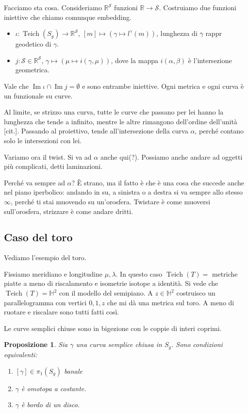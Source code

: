 \documentclass[a4paper]{article}
\newtheorem{proposition}{Proposizione}
\theoremstyle{definition}
\DeclareMathOperator{\Teich}{Teich}
\DeclareMathOperator{\im}{Im}
\begin{document}
    Facciamo sta cosa. Consideriamo $\mathbb R^\mathcal S$ funzioni $\mathbb R \to \mathcal S$. Costruiamo due funzioni iniettive che chiamo comunque embedding.
    \begin{itemize}
        \item $\iota: \Teich(S_g) \to \mathbb R^\mathcal{S}$, $[m] \mapsto \left(\gamma \mapsto l^\gamma(m)\right)$, lunghezza di $\overline{\gamma}$ rappr geodetico di $\gamma$.
        \item $j: \mathcal S \in \mathbb R^{\mathcal S}$, $\gamma \mapsto (\mu \mapsto i(\gamma,\mu))$, dove la mappa $i(\alpha,\beta)$ è l'intersezione geometrica.
    \end{itemize}

    Vale che $\im \iota \cap \im j = \emptyset$ e sono entrambe iniettive. Ogni metrica e ogni curva è un funzionale su curve.

    Al limite, se strizzo una curva, tutte le curve che passano per lei hanno la lunghezza che tende a infinito, mentre le altre rimangono dell'ordine dell'unità [cit.].
    Passando al proiettivo, tende all'intersezione della curva $\alpha$, perché contano solo le intersezioni con lei.

    Variamo ora il twist. Si va ad $\alpha$ anche qui(?). Possiamo anche andare ad oggetti più complicati, detti laminazioni.

    Perché va sempre ad $\alpha$? È strano, ma il fatto è che è una cosa che succede anche nel piano iperbolico: andando in su, a sinistra o a destra si va sempre allo stesso $\infty$, perché ti stai muovendo su un'orosfera. Twistare è come muoversi sull'orosfera, strizzare è come andare dritti.

\subsection{Caso del toro}
    Vediamo l'esempio del toro.

    Fissiamo meridiano e longitudine $ \mu, \lambda$. In questo caso $\Teich(T) =$ metriche piatte a meno di riscalamento e isometrie isotope a identità. Si vede che $\Teich(T) = \mathbb H^2$ con il modello del semipiano. A $z \in \mathbb H^2$ costruisco un parallelogramma con vertici $0, 1, z$ che mi dà una metrica sul toro. A meno di ruotare e riscalare sono tutti fatti così.

    Le curve semplici chiuse sono in bigezione con le coppie di interi coprimi.

    \begin{proposition}
        Sia $\gamma$ una curva semplice chiusa in $S_g$. Sono condizioni equivalenti:
        \begin{enumerate}
            \item $[\gamma] \in \pi_1(S_g)$ banale
            \item $\gamma$ è omotopa a costante.
            \item $\gamma$ è bordo di un disco.
        \end{enumerate}
    \end{proposition}
\end{document}
